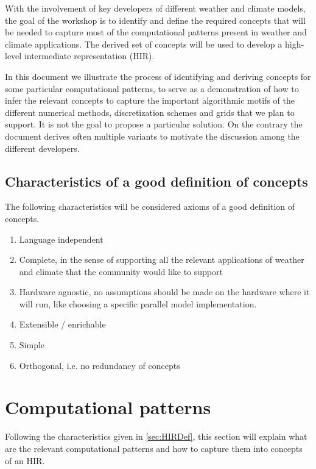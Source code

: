 \documentclass[a4paper,10pt]{scrartcl}
\begin{document}
With the involvement of key developers of different weather and climate
models, the goal of the workshop is to identify and define the required concepts
that will be needed to capture most of the computational
patterns present in weather and climate applications. The derived set of concepts will be used
to develop a high-level intermediate representation (HIR).

In this document we illustrate the process of identifying and deriving concepts 
for some particular computational patterns, to 
serve as a demonstration of how to infer the relevant concepts
to capture the important algorithmic motifs of the different numerical methods,
discretization schemes and grids that we plan to support.
It is not the goal to propose a particular solution. On the contrary the document
derives often multiple variants to motivate the discussion among the different developers.

\subsection{Characteristics of a good definition of concepts}

The following characteristics will be considered axioms of a good definition of concepts.
\label{sec:HIRDef}
\begin{enumerate}[label=\textbf{A.\arabic*}]
    \item Language independent 
    \item Complete, in the sense of supporting all the relevant applications of weather and climate that the community would like to support
    \item Hardware agnostic, no assumptions should be made on the hardware where it will run, like choosing a specific parallel model implementation. \label{A:hardware}
    \item Extensible / enrichable
    \item Simple
    \item Orthogonal, i.e. no redundancy of concepts \label{A:ortho}
\end{enumerate}

\section{Computational patterns}
\label{sec:comppatterns}

Following the characteristics given in \cref{sec:HIRDef}, this section will explain 
what are the relevant computational patterns and how to capture them into concepts of an HIR.
\end{document}
